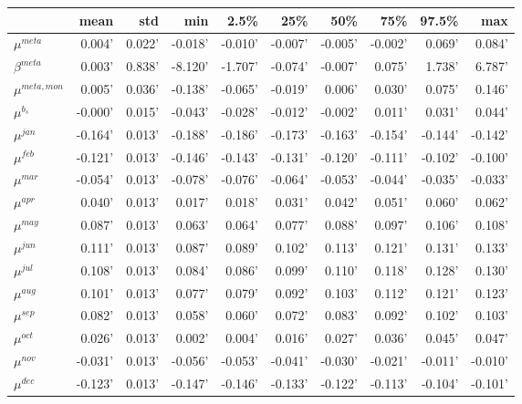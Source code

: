 \documentclass[12pt]{article}
\begin{document}
\begin{table}
  \begin{tabular}{lrrrrrrrrr}
  \toprule
  {} &    mean &    std &     min &    2.5\% &     25\% &     50\% &     75\% &   97.5\% &     max \\
  \midrule
  $\mu^{meta}$     &  0.004' & 0.022' & -0.018' & -0.010' & -0.007' & -0.005' & -0.002' &  0.069' &  0.084' \\
  $\beta^{meta}$   &  0.003' & 0.838' & -8.120' & -1.707' & -0.074' & -0.007' &  0.075' &  1.738' &  6.787' \\
  $\mu^{meta,mon}$ &  0.005' & 0.036' & -0.138' & -0.065' & -0.019' &  0.006' &  0.030' &  0.075' &  0.146' \\
  $\mu^{b_s}$      & -0.000' & 0.015' & -0.043' & -0.028' & -0.012' & -0.002' &  0.011' &  0.031' &  0.044' \\
  $\mu^{jan}$      & -0.164' & 0.013' & -0.188' & -0.186' & -0.173' & -0.163' & -0.154' & -0.144' & -0.142' \\
  $\mu^{feb}$      & -0.121' & 0.013' & -0.146' & -0.143' & -0.131' & -0.120' & -0.111' & -0.102' & -0.100' \\
  $\mu^{mar}$      & -0.054' & 0.013' & -0.078' & -0.076' & -0.064' & -0.053' & -0.044' & -0.035' & -0.033' \\
  $\mu^{apr}$     &  0.040' & 0.013' &  0.017' &  0.018' &  0.031' &  0.042' &  0.051' &  0.060' &  0.062' \\
  $\mu^{may}$      &  0.087' & 0.013' &  0.063' &  0.064' &  0.077' &  0.088' &  0.097' &  0.106' &  0.108' \\
  $\mu^{jun}$      &  0.111' & 0.013' &  0.087' &  0.089' &  0.102' &  0.113' &  0.121' &  0.131' &  0.133' \\
  $\mu^{jul}$      &  0.108' & 0.013' &  0.084' &  0.086' &  0.099' &  0.110' &  0.118' &  0.128' &  0.130' \\
  $\mu^{aug}$      &  0.101' & 0.013' &  0.077' &  0.079' &  0.092' &  0.103' &  0.112' &  0.121' &  0.123' \\
  $\mu^{sep}$     &  0.082' & 0.013' &  0.058' &  0.060' &  0.072' &  0.083' &  0.092' &  0.102' &  0.103' \\
  $\mu^{oct}$      &  0.026' & 0.013' &  0.002' &  0.004' &  0.016' &  0.027' &  0.036' &  0.045' &  0.047' \\
  $\mu^{nov}$     & -0.031' & 0.013' & -0.056' & -0.053' & -0.041' & -0.030' & -0.021' & -0.011' & -0.010' \\
  $\mu^{dec}$     & -0.123' & 0.013' & -0.147' & -0.146' & -0.133' & -0.122' & -0.113' & -0.104' & -0.101' \\

\end{tabular}
\end{table}
\end{document}
